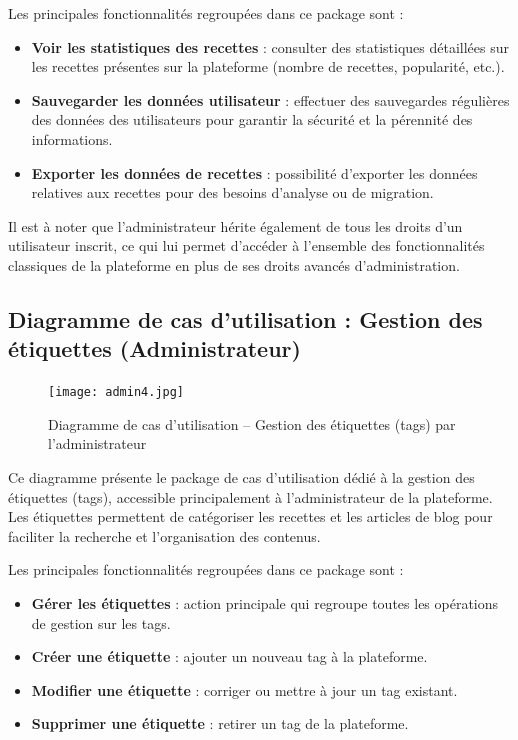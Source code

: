 \documentclass[12pt,a4paper]{report}
\begin{document}
Les principales fonctionnalités regroupées dans ce package sont :
\begin{itemize}
    \item \textbf{Voir les statistiques des recettes} : consulter des statistiques détaillées sur les recettes présentes sur la plateforme (nombre de recettes, popularité, etc.).
    \item \textbf{Sauvegarder les données utilisateur} : effectuer des sauvegardes régulières des données des utilisateurs pour garantir la sécurité et la pérennité des informations.
    \item \textbf{Exporter les données de recettes} : possibilité d’exporter les données relatives aux recettes pour des besoins d’analyse ou de migration.
\end{itemize}

Il est à noter que l’administrateur hérite également de tous les droits d’un utilisateur inscrit, ce qui lui permet d’accéder à l’ensemble des fonctionnalités classiques de la plateforme en plus de ses droits avancés d’administration.
\subsection{Diagramme de cas d’utilisation : Gestion des étiquettes (Administrateur)}

\begin{figure}[H]
    \centering
    \texttt{[image: admin4.jpg]}
    \caption{Diagramme de cas d’utilisation – Gestion des étiquettes (tags) par l’administrateur}
    \label{fig:usecase_admin_tags}
\end{figure}

Ce diagramme présente le package de cas d’utilisation dédié à la gestion des étiquettes (tags), accessible principalement à l’administrateur de la plateforme. Les étiquettes permettent de catégoriser les recettes et les articles de blog pour faciliter la recherche et l’organisation des contenus.

Les principales fonctionnalités regroupées dans ce package sont :
\begin{itemize}
    \item \textbf{Gérer les étiquettes} : action principale qui regroupe toutes les opérations de gestion sur les tags.
    \item \textbf{Créer une étiquette} : ajouter un nouveau tag à la plateforme.
    \item \textbf{Modifier une étiquette} : corriger ou mettre à jour un tag existant.
    \item \textbf{Supprimer une étiquette} : retirer un tag de la plateforme.
\end{itemize}
\end{document}
